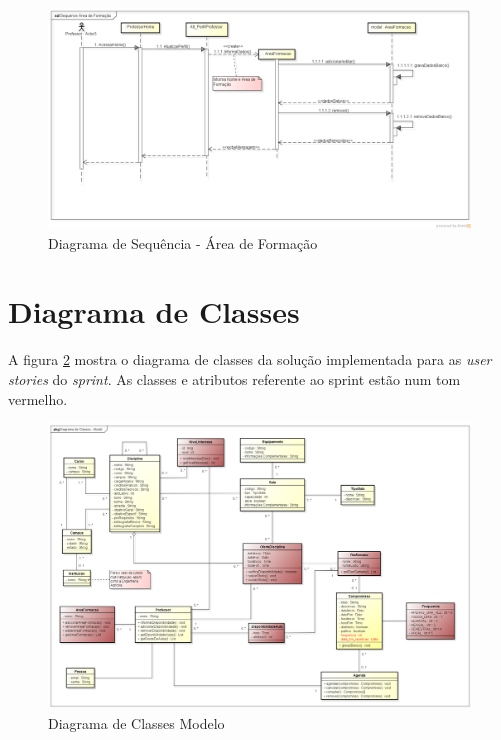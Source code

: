 \documentclass{abnt}
\begin{document}
\begin{landscape}
	\clearpage
		\begin{figure}[h]
		\begin{center}
			\includegraphics[width=750px]{SequenceAreaFormacao}
			\caption{Diagrama de Sequência -  Área de Formação}
			\label{fig:SequenceAreaFormacao}
			\end{center}
		\end{figure}
		\FloatBarrier
	\end{landscape}	
	\clearpage
	
	
		\section{Diagrama de Classes}
		
			A figura \ref{fig:DiagramaClassesModelo} mostra o diagrama de classes da solução implementada para as \emph{user stories} do \emph{sprint}. As classes e atributos referente ao sprint estão num tom vermelho.
			
		\begin{landscape}
			\begin{figure}[h]
				\begin{center}
					 \includegraphics[width=600px]{DiagramaClassesModelo}
					 \caption{Diagrama de Classes Modelo}
					 \label{fig:DiagramaClassesModelo}
				\end{center}
			\end{figure}
		\end{landscape}
\end{document}
